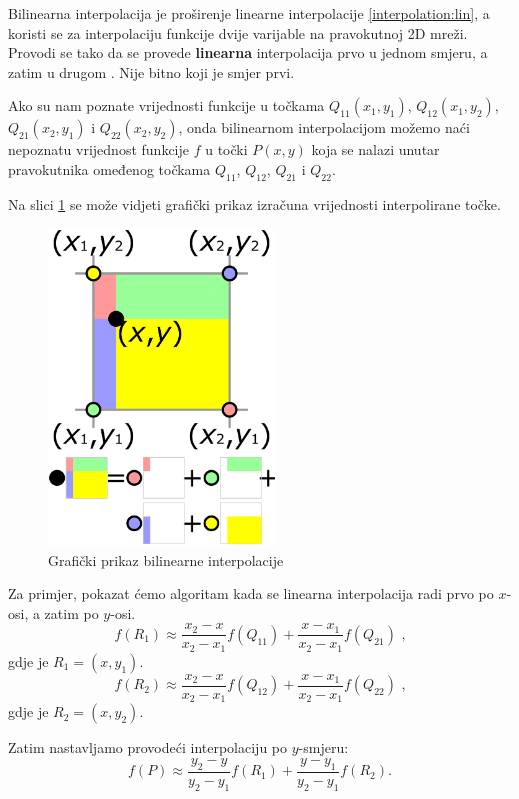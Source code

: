 Bilinearna interpolacija je proširenje linearne interpolacije \ref{interpolation:lin}, a koristi se za interpolaciju funkcije dvije varijable na pravokutnoj 2D mreži. Provodi se tako da se provede \textbf{linearna} interpolacija prvo u jednom smjeru, a zatim u drugom \citep {_bilinear_2013}. Nije bitno koji je smjer prvi.

Ako su nam poznate vrijednosti funkcije u točkama $Q_{11} (x_1, y_1)$, $Q_{12} (x_1, y_2)$, $Q_{21}  (x_2, y_1)$ i $Q_{22} (x_2, y_2)$, onda bilinearnom interpolacijom možemo naći nepoznatu vrijednost funkcije $f$ u točki $P (x, y)$ koja se nalazi unutar pravokutnika omeđenog točkama $Q_{11}$, $Q_{12}$, $Q_{21}$ i $Q_{22}$.

Na slici \ref{fig:bilintPrikaz} se može vidjeti grafički prikaz izračuna vrijednosti interpolirane točke.

\begin{figure}[ht]
\centering
\includegraphics[width=6cm]{figures/bilint_visualization.png}
\caption{Grafički prikaz bilinearne interpolacije}
\label{fig:bilintPrikaz}
\end{figure}

Za primjer, pokazat ćemo algoritam kada se linearna interpolacija radi prvo po $x$-osi, a zatim po $y$-osi.
\begin{equation}
f(R_1) \approx \frac{x_2 - x}{x_2 - x_1} f(Q_{11}) + \frac{x - x_1}{x_2 - x_1} f(Q_{21})\text{ ,}
\end{equation}
gdje je  $R_1 = (x, y_1)$.
\begin{equation}
f(R_2) \approx \frac{x_2 - x}{x_2 - x_1} f(Q_{12}) + \frac{x - x_1}{x_2 - x_1} f(Q_{22})\text{ ,}
\end{equation}
gdje je  $R_2 = (x, y_2)$.

Zatim nastavljamo provodeći interpolaciju po $y$-smjeru:
\begin{equation}
f(P) \approx \frac{y_2 - y}{y_2 - y_1} f(R_1) + \frac{y - y_1}{y_2 - y_1} f(R_2).
\end{equation}

